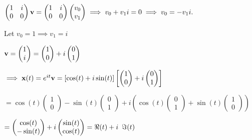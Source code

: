 \documentclass{article}
\begin{document}
$\begin{pmatrix} 1&i\\
  0&0\end{pmatrix} \bold{v} = \begin{pmatrix} 1&i\\
  0&0\end{pmatrix} \begin{pmatrix}v_0\\ v_1\end{pmatrix}\implies
v_0 + v_1i=0  \implies v_0=-v_1i.$

Let $v_0=1 \implies v_1=i$

$\bold{v} = \begin{pmatrix}1\\ i\end{pmatrix} = \begin{pmatrix}1\\
  0\end{pmatrix} + i \begin{pmatrix}0\\ 1\end{pmatrix}$

$\implies \bold{x}(t) = e^{it}\bold{v} = \left[\cos(t)+i\sin(t)\right]\left[  \begin{pmatrix}1\\
    0\end{pmatrix} + i \begin{pmatrix}0\\ 1\end{pmatrix} \right]$

$ = \cos(t)\begin{pmatrix}1\\
  0\end{pmatrix} -\sin(t)\begin{pmatrix}0\\
  1\end{pmatrix} +i\left(\cos(t)\begin{pmatrix}0\\
  1\end{pmatrix} +\sin(t) \begin{pmatrix}1\\
  0\end{pmatrix}\right)$

$= \begin{pmatrix}\cos(t)\\
  -\sin(t)\end{pmatrix}+i \begin{pmatrix} \sin(t)\\
  \cos(t)\end{pmatrix} = \Re(t) +i\enskip \Im(t)$
\end{document}
